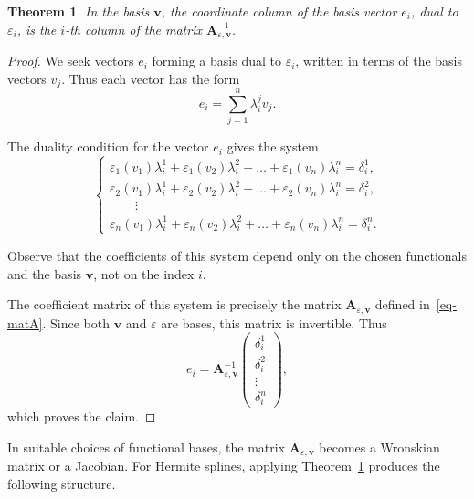 \documentclass{article}
\newtheorem{theorem}{Theorem}[section]
\theoremstyle{definition}
\theoremstyle{definition}
\numberwithin{figure}{section}
\newcommand{\1}{\mathbf{1}}
\begin{document}
\begin{theorem}\label{th-basiscalc}
In the basis \(\mathbf{v}\), the coordinate column of the basis vector \(e_i\), dual to \(\varepsilon_i\), is the \(i\)-th column of the matrix \(\mathbf{A}_{\varepsilon,\mathbf{v}}^{-1}\).
\end{theorem}

\begin{proof}
We seek vectors \(e_i\) forming a basis dual to \(\varepsilon_i\), written in terms of the basis vectors \(v_j\). Thus each vector has the form
\[
    e_i = \sum_{j=1}^n \lambda_i^j v_j.
\]

The duality condition for the vector \(e_i\) gives the system
\[
\begin{cases}
\varepsilon_1(v_1)\lambda_i^1 + \varepsilon_1(v_2)\lambda_i^2 + \dots + \varepsilon_1(v_n)\lambda_i^n = \delta_i^1,\\
\varepsilon_2(v_1)\lambda_i^1 + \varepsilon_2(v_2)\lambda_i^2 + \dots + \varepsilon_2(v_n)\lambda_i^n = \delta_i^2,\\
\qquad \vdots\\
\varepsilon_n(v_1)\lambda_i^1 + \varepsilon_n(v_2)\lambda_i^2 + \dots + \varepsilon_n(v_n)\lambda_i^n = \delta_i^n.
\end{cases}
\]

Observe that the coefficients of this system depend only on the chosen functionals and the basis \(\mathbf{v}\), not on the index \(i\).

The coefficient matrix of this system is precisely the matrix \(\mathbf{A}_{\varepsilon,\mathbf{v}}\) defined in~\eqref{eq-matA}.  
Since both \(\mathbf{v}\) and \(\varepsilon\) are bases, this matrix is invertible. Thus
\[
    e_i = \mathbf{A}_{\varepsilon,\mathbf{v}}^{-1}
    \begin{pmatrix}
        \delta_i^1\\ \delta_i^2\\ \vdots\\ \delta_i^n
    \end{pmatrix},
\]
which proves the claim.
\end{proof}

\bigskip

In suitable choices of functional bases, the matrix \(\mathbf{A}_{\varepsilon,\mathbf{v}}\) becomes a Wronskian matrix or a Jacobian.  
For Hermite splines, applying Theorem~\ref{th-basiscalc} produces the following structure.
\end{document}
